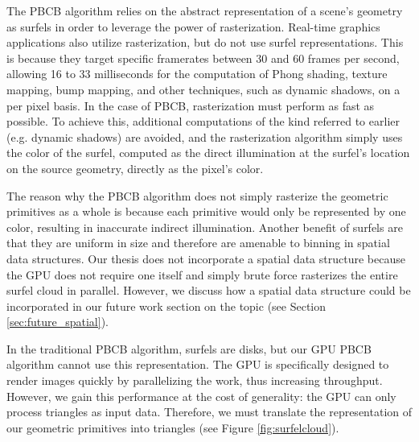 The PBCB algorithm relies on the abstract representation of a scene's geometry as surfels in order to leverage the power of rasterization. Real-time graphics applications also utilize rasterization, but do not use surfel representations. This is because they target specific framerates between 30 and 60 frames per second, allowing 16 to 33 milliseconds for the computation of Phong shading, texture mapping, bump mapping, and other techniques, such as dynamic shadows, on a per pixel basis. In the case of PBCB, rasterization must perform as fast as possible. To achieve this, additional computations of the kind referred to earlier (e.g. dynamic shadows) are avoided, and the rasterization algorithm simply uses the color of the surfel, computed as the direct illumination at the surfel's location on the source geometry, directly as the pixel's color.

The reason why the PBCB algorithm does not simply rasterize the geometric primitives as a whole is because each primitive would only be represented by one color, resulting in inaccurate indirect illumination. Another benefit of surfels are that they are uniform in size and therefore are amenable to binning in spatial data structures. Our thesis does not incorporate a spatial data structure because the GPU does not require one itself and simply brute force rasterizes the entire surfel cloud in parallel. However, we discuss how a spatial data structure could be incorporated in our future work section on the topic (see Section \ref{sec:future_spatial}).

In the traditional PBCB algorithm, surfels are disks, but our GPU PBCB algorithm cannot use this representation. The GPU is specifically designed to render images quickly by parallelizing the work, thus increasing throughput. However, we gain this performance at the cost of generality: the GPU can only process triangles as input data. Therefore, we must translate the representation of our geometric primitives into triangles (see Figure \ref{fig:surfelcloud}).

